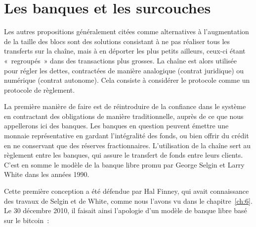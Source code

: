
\section*{Les banques et les surcouches}

Les autres propositions généralement citées comme alternatives à l'augmentation de la taille des blocs sont des solutions consistant à ne pas réaliser tous les transferts sur la chaîne, mais à en déporter les plus petits ailleurs, ceux-ci étant «~regroupés~» dans des transactions plus grosses. La chaîne est alors utilisée pour régler les dettes, contractées de manière analogique (contrat juridique) ou numérique (contrat autonome). Cela consiste à considérer le protocole comme un protocole de règlement.


La première manière de faire est de réintroduire de la confiance dans le système en contractant des obligations de manière traditionnelle, auprès de ce que nous appellerons ici des banques. Les banques en question peuvent émettre une monnaie représentative en gardant l'intégralité des fonds, ou bien offrir du crédit en ne conservant que des réserves fractionnaires. L'utilisation de la chaîne sert au règlement entre les banques, qui assure le transfert de fonds entre leurs clients. C'est en somme le modèle de la banque libre promu par George Selgin et Larry White dans les années 1990.

Cette première conception a été défendue par Hal Finney, qui avait connaissance des travaux de Selgin et de White, comme nous l'avons vu dans le chapitre~\ref{ch:6}. Le 30 décembre 2010, il faisait ainsi l'apologie d'un modèle de banque libre basé sur le bitcoin~:

